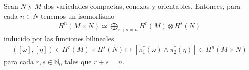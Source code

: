 \documentclass[11pt]{article}
\newcommand{\N}{\mathbb{N}}
\newcommand{\paint}[1]{\color{color}{#1}}
\newenvironment{theorem}[2][Teorema]{\begin{trivlist}
\item[\hskip \labelsep \paint{{\bfseries #1}}\hskip \labelsep {\bfseries #2.}]}{\end{trivlist}}
\begin{document}
\begin{tcolorbox}
\begin{theorem}{8 (fórmula de Künneth)} Sean $N$ y $M$ dos variedades compactas, conexas y orientables. Entonces, para cada $n \in N$ tenemos un isomorfismo
\begin{align*}
H^n(M \times N) \simeq \bigoplus_{r+s = n}H^r(M) \otimes H^s(N)
\end{align*}
inducido por las funciones bilineales
\begin{align*}
([\omega],[\eta]) \in H^r(M) \times H^s(N) \mapsto [\pi_1^*(\omega) \wedge \pi_2^*(\eta)] \in H^n(M \times N)
\end{align*}
para cada $r,s \in \N_0$ tales que $r+s = n$.
\end{theorem}
\end{tcolorbox}
\end{document}
